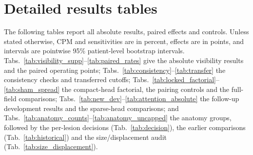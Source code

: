 \section{Detailed results tables}
\label{supp:tables}
The following tables report all absolute results, paired effects and controls. Unless stated otherwise, CPM and sensitivities are in percent, effects are in points, and intervals are pointwise 95\% patient-level bootstrap intervals. Tabs.~\ref{tab:visibility_supp}--\ref{tab:paired_rates} give the absolute visibility results and the paired operating points; Tabs.~\ref{tab:consistency}--\ref{tab:transfer} the consistency checks and transferred cutoffs; Tabs.~\ref{tab:locked_factorial}--\ref{tab:sham_spread} the compact-head factorial, the pairing controls and the full-field comparisons; Tabs.~\ref{tab:new_dev}--\ref{tab:attention_absolute} the follow-up development results and the sparse-head comparisons; and Tabs.~\ref{tab:anatomy_counts}--\ref{tab:anatomy_uncapped} the anatomy groups, followed by the per-lesion decisions (Tab.~\ref{tab:decision}), the earlier comparisons (Tab.~\ref{tab:historical}) and the size/displacement audit (Tab.~\ref{tab:size_displacement}).





















